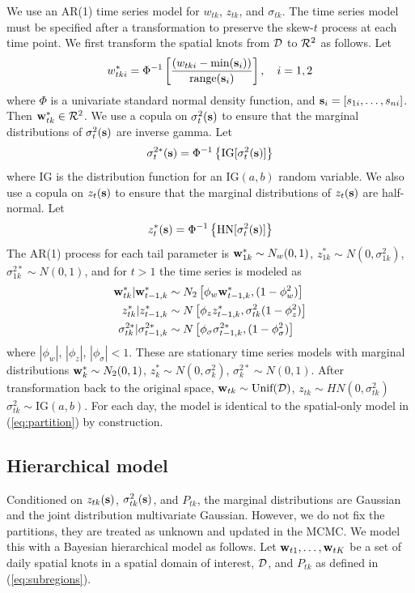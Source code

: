 \documentclass[11pt]{article}
\begin{document}
We use an AR(1) time series model for $w_{tk}$, $z_{tk}$, and $\sigma_{tk}$.
The time series model must be specified after a transformation to preserve the skew-$t$ process at each time point.
We first transform the spatial knots from ${\cal D}$ to ${\cal R}^2$ as follows.
Let
\begin{align}
  w^*_{tki} = \Phi^{-1}\left[ \frac{ (w_{tki} - \min(\mbox{\bf s}_i))}{ \text{range}(\mbox{\bf s}_i) } \right], \quad i = 1, 2
\end{align}
where $\Phi$ is a univariate standard normal density function, and $\mbox{\bf s}_i = [s_{1i}, \ldots, s_{ni}]$.
Then $\mbox{\bf w}^*_{tk} \in {\cal R}^2$.
We use a copula on $\sigma^2_t(\mbox{\bf s})$ to ensure that the marginal distributions of $\sigma^2_t(\mbox{\bf s})$ are inverse gamma.
Let
\begin{align}
  \sigma^{2*}_t(\mbox{\bf s}) =\Phi^{-1}\left\{ \text{IG}[\sigma^2_t(\mbox{\bf s})] \right\}
\end{align}
where IG is the distribution function for an IG$(a, b)$ random variable.
We also use a copula on $z_{t}(\mbox{\bf s})$ to ensure that the marginal distributions of $z_t(\mbox{\bf s})$ are half-normal.
Let
\begin{align}
  z^*_t(\mbox{\bf s}) = \Phi^{-1}\left\{ \text{HN}[\sigma^2_t(\mbox{\bf s})] \right\}
\end{align}
The AR(1) process for each tail parameter is $\mbox{\bf w}^*_{1k} \sim N_w(0, 1)$, $z^*_{1k} \sim N(0, \sigma^2_{1k})$, $\sigma^{2*}_{1k} \sim N(0, 1)$, and for $t > 1$ the time series is modeled as
\begin{align}
  \mbox{\bf w}^*_{tk} | \mbox{\bf w}^*_{t-1, k} &\sim N_2\left[\phi_w \mbox{\bf w}^*_{t-1, k}, (1 - \phi_w^2) \right] \\
  z^*_{tk} | z^*_{t-1, k} &\sim N \left[\phi_z z^*_{t-1, k}, \sigma^2_{tk} (1 - \phi_z^2)\right] \\
  \sigma^{2*}_{tk} | \sigma^{2*}_{t-1, k} &\sim N \left[\phi_\sigma \sigma^{2*}_{t-1, k}, (1 - \phi_\sigma^2) \right]
\end{align}
where $|\phi_w|$, $|\phi_z|$, $|\phi_\sigma| < 1$.
These are stationary time series models with marginal distributions $\mbox{\bf w}^*_{k} \sim N_2(0, 1)$, $z^*_{k} \sim N(0, \sigma^2_{k})$, $\sigma^{2*}_{k} \sim N(0, 1)$.
After transformation back to the original space, $\mbox{\bf w}_{tk} \sim \text{Unif}({\cal D})$, $z_{tk} \sim HN(0, \sigma^2_{tk})$ $\sigma^2_{tk} \sim \text{IG}(a, b)$.
For each day, the model is identical to the spatial-only model in (\ref{eq:partition}) by construction.

\subsection{Hierarchical model}\label{s:hier}
Conditioned on $z_{tk}(\mbox{\bf s})$, $\sigma^2_{tk}(\mbox{\bf s})$, and $P_{tk}$, the marginal distributions are Gaussian and the joint distribution multivariate Gaussian.
However, we do not fix the partitions, they are treated as unknown and updated in the MCMC.
We model this with a Bayesian hierarchical model as follows.
Let $\mbox{\bf w}_{t1}, \ldots, \mbox{\bf w}_{tK}$ be a set of daily spatial knots in a spatial domain of interest, ${\cal D}$, and $P_{tk}$ as defined in (\ref{eq:subregions}).
\end{document}
